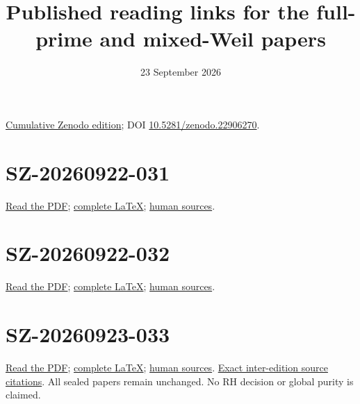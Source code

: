 \documentclass{article}
\title{Published reading links for the full-prime and mixed-Weil papers}
\author{}
\date{23 September 2026}
\begin{document}
\maketitle
\href{https://zenodo.org/records/22906270}{Cumulative Zenodo edition}; DOI \href{https://doi.org/10.5281/zenodo.22906270}{10.5281/zenodo.22906270}.
\section*{SZ-20260922-031}
\href{https://zenodo.org/records/22906270/files/150-splitzero-full-prime-cohomology.pdf?download=1}{Read the PDF}; \href{https://github.com/KokunoYumeto/zeta-function-research-reader/blob/3c78cfbd9e194d35117b33277c421c6564ce3dbf/workbenches/splitzero-tandem/continuations/20260923-full-prime-support/031/01_REBUILT_MATHEMATICS.tex}{complete LaTeX}; \href{https://github.com/KokunoYumeto/zeta-function-research-reader/blob/3c78cfbd9e194d35117b33277c421c6564ce3dbf/workbenches/splitzero-tandem/continuations/20260923-full-prime-support/031/05_SOURCE_READING_LEDGER.json}{human sources}.
\section*{SZ-20260922-032}
\href{https://zenodo.org/records/22906270/files/151-splitzero-complete-support-reconstruction.pdf?download=1}{Read the PDF}; \href{https://github.com/KokunoYumeto/zeta-function-research-reader/blob/3c78cfbd9e194d35117b33277c421c6564ce3dbf/workbenches/splitzero-tandem/continuations/20260923-full-prime-support/032/RECOVERED_PROGRAMME.tex}{complete LaTeX}; \href{https://github.com/KokunoYumeto/zeta-function-research-reader/blob/3c78cfbd9e194d35117b33277c421c6564ce3dbf/workbenches/splitzero-tandem/continuations/20260923-full-prime-support/032/HUMAN_SOURCES.md}{human sources}.
\section*{SZ-20260923-033}
\href{https://zenodo.org/records/22906270/files/152-splitzero-mixed-weil-and-boundary.pdf?download=1}{Read the PDF}; \href{https://github.com/KokunoYumeto/zeta-function-research-reader/blob/3c78cfbd9e194d35117b33277c421c6564ce3dbf/workbenches/splitzero-tandem/continuations/20260923-full-prime-support/033/MIXED_PRIME_ENERGY_AND_BOUNDARY.tex}{complete LaTeX}; \href{https://github.com/KokunoYumeto/zeta-function-research-reader/blob/3c78cfbd9e194d35117b33277c421c6564ce3dbf/workbenches/splitzero-tandem/continuations/20260923-full-prime-support/033/HUMAN_SOURCES.md}{human sources}.
\href{https://github.com/KokunoYumeto/zeta-function-research-reader/blob/e4301ff7c623b077204183fa77505ab735a48477/workbenches/splitzero-tandem/continuations/20260923-full-prime-support-links/INTER_EDITION_SOURCE_LINKS.tex}{Exact inter-edition source citations}. All sealed papers remain unchanged. No RH decision or global purity is claimed.
\end{document}

